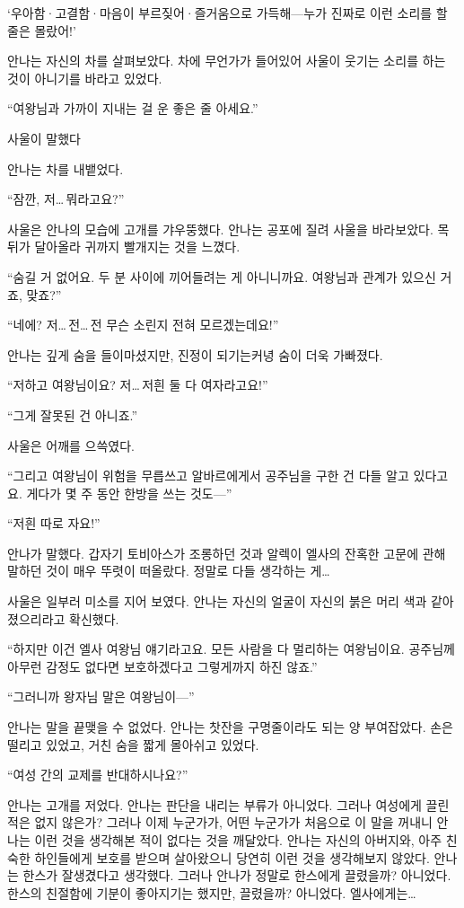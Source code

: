 `우아함·고결함·마음이 부르짖어·즐거움으로 가득해—누가 진짜로 이런 소리를 할 줄은 몰랐어!'

안나는 자신의 차를 살펴보았다. 차에 무언가가 들어있어 사울이 웃기는 소리를 하는 것이 아니기를 바라고 있었다.

``여왕님과 가까이 지내는 걸 운 좋은 줄 아세요.''

사울이 말했다

안나는 차를 내뱉었다.

``잠깐, 저\ldots\,뭐라고요?''

사울은 안나의 모습에 고개를 갸우뚱했다. 안나는 공포에 질려 사울을 바라보았다. 목 뒤가 달아올라 귀까지 빨개지는 것을 느꼈다.

``숨길 거 없어요. 두 분 사이에 끼어들려는 게 아니니까요. 여왕님과 관계가 있으신 거죠, 맞죠?''

``네에? 저\ldots\,전\ldots\,전 무슨 소린지 전혀 모르겠는데요!''

안나는 깊게 숨을 들이마셨지만, 진정이 되기는커녕 숨이 더욱 가빠졌다.

``저하고 여왕님이요? 저\ldots\,저흰 둘 다 여자라고요!''

``그게 잘못된 건 아니죠.''

사울은 어깨를 으쓱였다.

``그리고 여왕님이 위험을 무릅쓰고 알바르에게서 공주님을 구한 건 다들 알고 있다고요. 게다가 몇 주 동안 한방을 쓰는 것도—''

``저흰 따로 자요!''

안나가 말했다. 갑자기 토비아스가 조롱하던 것과 알렉이 엘사의 잔혹한 고문에 관해 말하던 것이 매우 뚜렷이 떠올랐다. 정말로 다들 생각하는 게\ldots

사울은 일부러 미소를 지어 보였다. 안나는 자신의 얼굴이 자신의 붉은 머리 색과 같아졌으리라고 확신했다.

``하지만 이건 엘사 여왕님 얘기라고요. 모든 사람을 다 멀리하는 여왕님이요. 공주님께 아무런 감정도 없다면 보호하겠다고 그렇게까지 하진 않죠.''

``그러니까 왕자님 말은 여왕님이—''

안나는 말을 끝맺을 수 없었다. 안나는 찻잔을 구명줄이라도 되는 양 부여잡았다. 손은 떨리고 있었고, 거친 숨을 짧게 몰아쉬고 있었다.

``여성 간의 교제를 반대하시나요?''

안나는 고개를 저었다. 안나는 판단을 내리는 부류가 아니었다. 그러나 여성에게 끌린 적은 없지 않은가? 그러나 이제 누군가가, 어떤 누군가가 처음으로 이 말을 꺼내니 안나는 이런 것을 생각해본 적이 없다는 것을 깨달았다. 안나는 자신의 아버지와, 아주 친숙한 하인들에게 보호를 받으며 살아왔으니 당연히 이런 것을 생각해보지 않았다. 안나는 한스가 잘생겼다고 생각했다. 그러나 안나가 정말로 한스에게 끌렸을까? 아니었다. 한스의 친절함에 기분이 좋아지기는 했지만, 끌렸을까? 아니었다. 엘사에게는\ldots

